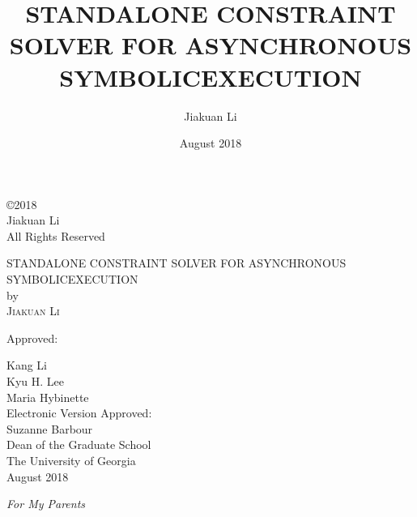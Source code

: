 \documentclass[12pt,notitlepage]{report}  %
\newcommand{\dissertationtitle}{STANDALONE CONSTRAINT SOLVER FOR ASYNCHRONOUS SYMBOLICEXECUTION}
\newcommand{\whoami}{Jiakuan Li}
\begin{document}
\newpage
\thispagestyle{empty}
\vspace*{5.5in}
\begin{center}
\copyright 2018 \\
\whoami \\
All Rights Reserved
\end{center}

\newpage
\thispagestyle{empty}
\vspace*{18pt}
\begin{center}
\textsc{\large{\dissertationtitle}}\\[18pt]
by\\[18pt]
\textsc{\whoami}
\end{center}
\vfill
\begin{flushleft}\singlespacing
\hskip 200pt {Approved:}\\
\vskip 12pt

\hspace*{200pt}Kang Li\\
\vskip 12pt
\hspace*{200pt}Kyu H. Lee\\
\hspace*{200pt}\makebox[100pt][l]{~                }Maria Hybinette\\
\vfill
Electronic Version Approved:\\[12pt]
Suzanne Barbour\\
Dean of the Graduate School\\
The University of Georgia\\
August 2018
\end{flushleft}

\title{\textbf{\dissertationtitle}}
\author{\whoami}
\date{August 2018}
\maketitle
\thispagestyle{empty}

\newpage
\vspace*{1.5in}
\begin{center}
\emph{For My Parents}\\
\vspace{1cm}
\end{center}
\end{document}
